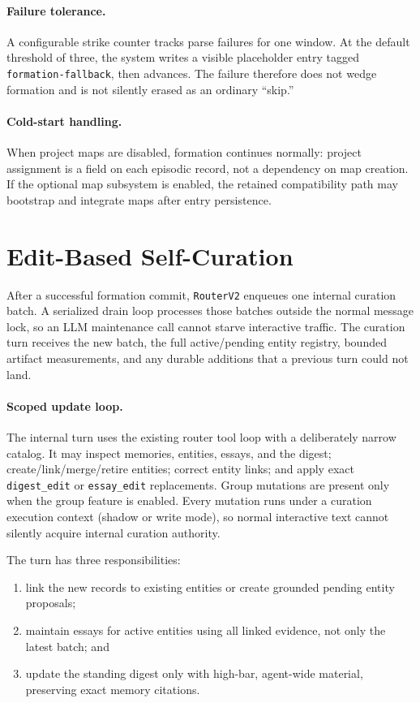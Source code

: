 \documentclass[11pt,letterpaper]{report}
\newcommand{\code}[1]{\texttt{#1}}
\begin{document}
\paragraph{Failure tolerance.}
A configurable strike counter tracks parse failures for one window. At the
default threshold of three, the system writes a visible placeholder entry
tagged \code{formation-fallback}, then advances. The failure therefore does
not wedge formation and is not silently erased as an ordinary ``skip.''

\paragraph{Cold-start handling.}
When project maps are disabled, formation continues normally: project
assignment is a field on each episodic record, not a dependency on map
creation. If the optional map subsystem is enabled, the retained compatibility
path may bootstrap and integrate maps after entry persistence.

\section{Edit-Based Self-Curation}
\label{sec:self-curation}

After a successful formation commit, \code{RouterV2} enqueues one internal
curation batch. A serialized drain loop processes those batches outside the
normal message lock, so an LLM maintenance call cannot starve interactive
traffic. The curation turn receives the new batch, the full active/pending
entity registry, bounded artifact measurements, and any durable additions
that a previous turn could not land.

\paragraph{Scoped update loop.}
The internal turn uses the existing router tool loop with a deliberately
narrow catalog. It may inspect memories, entities, essays, and the digest;
create/link/merge/retire entities; correct entity links; and apply exact
\code{digest\_edit} or \code{essay\_edit} replacements. Group mutations are
present only when the group feature is enabled. Every mutation runs under a
curation execution context (shadow or write mode), so normal interactive text
cannot silently acquire internal curation authority.

The turn has three responsibilities:
\begin{enumerate}[nosep]
  \item link the new records to existing entities or create grounded pending
        entity proposals;
  \item maintain essays for active entities using all linked evidence, not
        only the latest batch; and
  \item update the standing digest only with high-bar, agent-wide material,
        preserving exact memory citations.
\end{enumerate}
\end{document}
